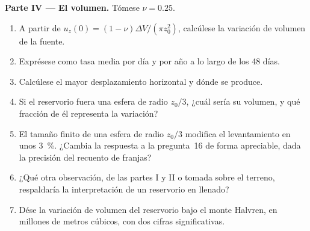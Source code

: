 \begin{problem}
\medskip\noindent\textbf{Parte IV --- El volumen.} Tómese $\nu = 0.25$.
\begin{enumerate}[resume]
\item A partir de $u_z(0) = (1 - \nu)\Delta V/(\pi z_0^2)$, calcúlese la variación de volumen
  de la fuente.
\item Exprésese como tasa media por día y por año a lo largo de los 48 días.
\item Calcúlese el mayor desplazamiento horizontal y dónde se produce.
\item Si el reservorio fuera una esfera de radio $z_0/3$, ¿cuál sería su
  volumen, y qué fracción de él representa la variación?
\item El tamaño finito de una esfera de radio $z_0/3$ modifica el levantamiento en
  unos \qty{3}{\percent}. ¿Cambia la respuesta a la pregunta~16
  de forma apreciable, dada la precisión del recuento de franjas?
\item ¿Qué otra observación, de las partes I y II o tomada sobre el terreno,
  respaldaría la interpretación de un reservorio en llenado?
\item Dése la variación de volumen del reservorio bajo el monte Halvren, en
  millones de metros cúbicos, con dos cifras significativas.
\end{enumerate}
\end{problem}
